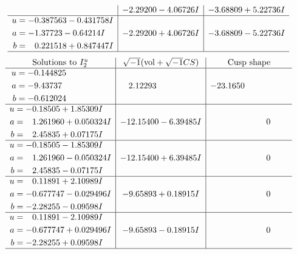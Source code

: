 \documentclass[1p]{elsarticle_modified}
\theoremstyle{definition}
\newcommand{\I}{\sqrt{-1}}
\begin{document}
$$\begin{array}{c|c|c}
 & -2.29200 - 4.06726 I & -3.68809 + 5.22736 I \\ \hline\begin{aligned}
u &= -0.387563 - 0.431758 I \\
a &= -1.37723 - 0.64214 I \\
b &= \phantom{-}0.221518 + 0.847447 I\end{aligned}
 & -2.29200 + 4.06726 I & -3.68809 - 5.22736 I\\
 \hline 
 \end{array}$$\newpage$$\begin{array}{c|c|c}  
\text{Solutions to }I^u_{2}& \I (\text{vol} + \sqrt{-1}CS) & \text{Cusp shape}\\
 \hline 
\begin{aligned}
u &= -0.144825\phantom{ +0.000000I} \\
a &= -9.43737\phantom{ +0.000000I} \\
b &= -0.612024\phantom{ +0.000000I}\end{aligned}
 & \phantom{-}2.12293\phantom{ +0.000000I} & -23.1650\phantom{ +0.000000I} \\ \hline\begin{aligned}
u &= -0.18505 + 1.85309 I \\
a &= \phantom{-}1.261960 + 0.050324 I \\
b &= \phantom{-}2.45835 + 0.07175 I\end{aligned}
 & -12.15400 - 6.39485 I & \phantom{-0.000000 } 0 \\ \hline\begin{aligned}
u &= -0.18505 - 1.85309 I \\
a &= \phantom{-}1.261960 - 0.050324 I \\
b &= \phantom{-}2.45835 - 0.07175 I\end{aligned}
 & -12.15400 + 6.39485 I & \phantom{-0.000000 } 0 \\ \hline\begin{aligned}
u &= \phantom{-}0.11891 + 2.10989 I \\
a &= -0.677747 - 0.029496 I \\
b &= -2.28255 - 0.09598 I\end{aligned}
 & -9.65893 + 0.18915 I & \phantom{-0.000000 } 0 \\ \hline\begin{aligned}
u &= \phantom{-}0.11891 - 2.10989 I \\
a &= -0.677747 + 0.029496 I \\
b &= -2.28255 + 0.09598 I\end{aligned}
 & -9.65893 - 0.18915 I & \phantom{-0.000000 } 0\\
 \hline 
 \end{array}$$\newpage
\end{document}
